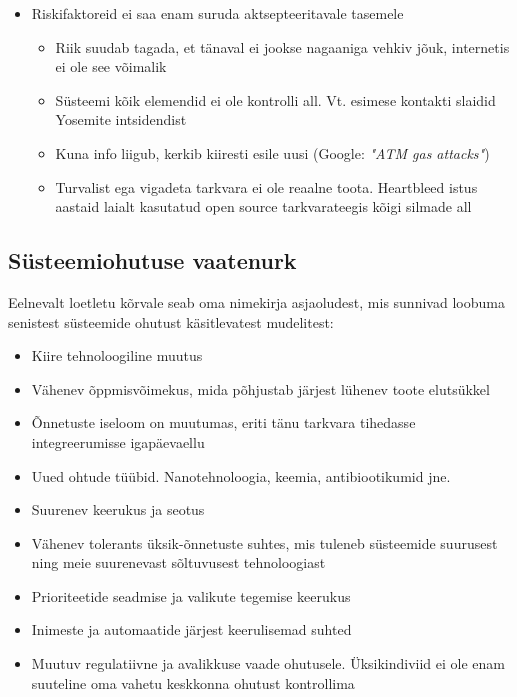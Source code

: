 \documentclass{article}
\begin{document}
\begin{itemize}
		\item Riskifaktoreid ei saa enam suruda aktsepteeritavale tasemele
			\begin{itemize}
		\item Riik suudab tagada, et tänaval ei jookse nagaaniga vehkiv jõuk, internetis ei ole see võimalik
		\item Süsteemi kõik elemendid ei ole kontrolli all. Vt. esimese kontakti slaidid Yosemite intsidendist
		\item Kuna info liigub, kerkib kiiresti esile uusi (Google: \emph{"ATM gas attacks"})
		\item Turvalist ega vigadeta tarkvara ei ole reaalne toota. Heartbleed istus aastaid laialt kasutatud open source tarkvarateegis kõigi silmade all
	\end{itemize}

\end{itemize}
\subsection{Süsteemiohutuse vaatenurk}
Eelnevalt loetletu kõrvale seab \cite{leveson2011engineering} oma nimekirja asjaoludest, mis sunnivad loobuma senistest süsteemide ohutust käsitlevatest mudelitest:
\begin{itemize}
	\item Kiire tehnoloogiline muutus
	\item Vähenev õppmisvõimekus, mida põhjustab järjest lühenev toote elutsükkel
	\item Õnnetuste iseloom on muutumas, eriti tänu tarkvara tihedasse integreerumisse igapäevaellu
	\item Uued ohtude tüübid. Nanotehnoloogia, keemia, antibiootikumid jne.
	\item Suurenev keerukus ja seotus
	\item Vähenev tolerants üksik-õnnetuste suhtes, mis tuleneb süsteemide suurusest ning meie suurenevast sõltuvusest tehnoloogiast
	\item Prioriteetide seadmise ja valikute tegemise keerukus
	\item Inimeste ja automaatide järjest keerulisemad suhted
	\item Muutuv regulatiivne ja avalikkuse vaade ohutusele. Üksikindiviid ei ole enam suuteline oma vahetu keskkonna ohutust kontrollima
\end{itemize}
\end{document}
